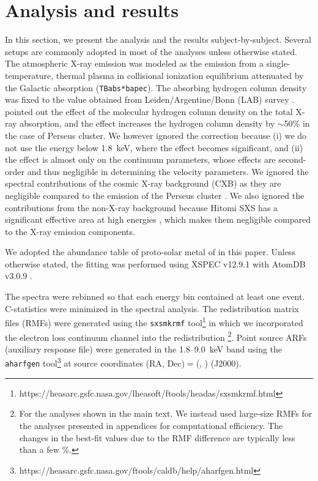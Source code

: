 \section{Analysis and results}
\label{sec:analysis}

In this section, we present the analysis and the results subject-by-subject. Several setups are commonly adopted in most of the analyses unless otherwise stated. The atmospheric X-ray emission was modeled as the emission from a single-temperature, thermal plasma in collisional ionization equilibrium attenuated by the Galactic absorption (\verb+TBabs*bapec+). The absorbing hydrogen column density was fixed to the value obtained from Leiden/Argentine/Bonn (LAB) survey \citep[$N_{\rm H}=0.138\times10^{22}~\mathrm{cm}^{-2}$;][]{Kalberla05}. \citet{willingale13} pointed out the effect of the molecular hydrogen column density on the total X-ray absorption, and the effect increases the hydrogen column density by $\sim$50\% in the case of Perseus cluster. We however ignored the correction because (i) we do not use the energy below 1.8~keV, where the effect becomes significant, and (ii) the effect is almost only on the continuum parameters, whose effects are second-order and thus negligible in determining the velocity parameters. We ignored the spectral contributions of the cosmic X-ray background (CXB) as they are negligible compared to the emission of the Perseus cluster \citep{kilbourne16b}. We also ignored the contributions from the non-X-ray background because Hitomi SXS has a significant effective area at high energies \citep{okajima17}, which makes them negligible compared to the X-ray emission components.

We adopted the abundance table of proto-solar metal of \citet{Lodders09} in this paper. Unless otherwise stated, the fitting was performed using {\small XSPEC} v12.9.1 \citep{Arnaud96} with AtomDB v3.0.9 \citep{smith01,foster12}.

The spectra were rebinned so that each energy bin contained at least one event. C-statistics were minimized in the spectral analysis. The redistribution matrix files (RMFs) were generated using the \verb+sxsmkrmf+ tool\footnote{https://heasarc.gsfc.nasa.gov/lheasoft/ftools/headas/sxsmkrmf.html} in which we incorporated the electron loss continuum channel into the redistribution \citep[extra-large-size RMF;][]{leutenegger16}\footnote{For the analyses shown in the main text. We instead used large-size RMFs for the analyses presented in appendices for computational efficiency. The changes in the best-fit values due to the RMF difference are typically less than a few \%.}. Point source ARFs (auxiliary response file) were generated in the 1.8--9.0~keV band using the \verb+aharfgen+ tool\footnote{https://heasarc.gsfc.nasa.gov/ftools/caldb/help/aharfgen.html} at source coordinates (RA, Dec)$=$(, ) (J2000).

